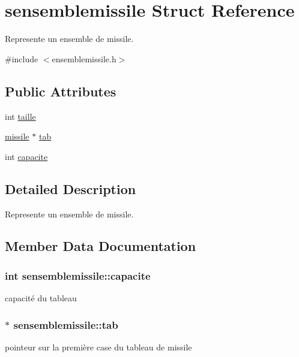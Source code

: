 \hypertarget{structsensemblemissile}{}\section{sensemblemissile Struct Reference}
\label{structsensemblemissile}


Represente un ensemble de missile.  




{\ttfamily \#include $<$ensemblemissile.\+h$>$}

\subsection*{Public Attributes}
\begin{DoxyCompactItemize}
\item 
int \hyperlink{structsensemblemissile_a5886bfe353020c03ef6beace07674f7c}{taille}
\item 
\hyperlink{structsmissile}{missile} $\ast$ \hyperlink{structsensemblemissile_ab4c6d0d88956b7008c875acc4da0bca5}{tab}
\item 
int \hyperlink{structsensemblemissile_a2330a5eb570be1012376cfe9a312eb62}{capacite}
\end{DoxyCompactItemize}


\subsection{Detailed Description}
Represente un ensemble de missile. 

\subsection{Member Data Documentation}
\subsubsection[{\texorpdfstring{capacite}{capacite}}]{\setlength{\rightskip}{0pt plus 5cm}int sensemblemissile\+::capacite}\hypertarget{structsensemblemissile_a2330a5eb570be1012376cfe9a312eb62}{}\label{structsensemblemissile_a2330a5eb570be1012376cfe9a312eb62}
capacité du tableau 
\subsubsection[{\texorpdfstring{tab}{tab}}]{$\ast$ sensemblemissile\+::tab}\hypertarget{structsensemblemissile_ab4c6d0d88956b7008c875acc4da0bca5}{}\label{structsensemblemissile_ab4c6d0d88956b7008c875acc4da0bca5}
pointeur sur la première case du tableau de missile 
